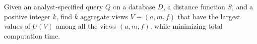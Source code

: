
\begin{problem}
\vspace{-5pt}
Given an analyst-specified query $Q$ on a database $D$, a distance function $S$,
and a positive integer $k$, find $k$ aggregate views $V \equiv (a, m, f)$ that
have the largest values of $U(V)$ among all the views $(a, m, f)$, 
while minimizing total computation time.
\vspace{-5pt}
\end{problem}





